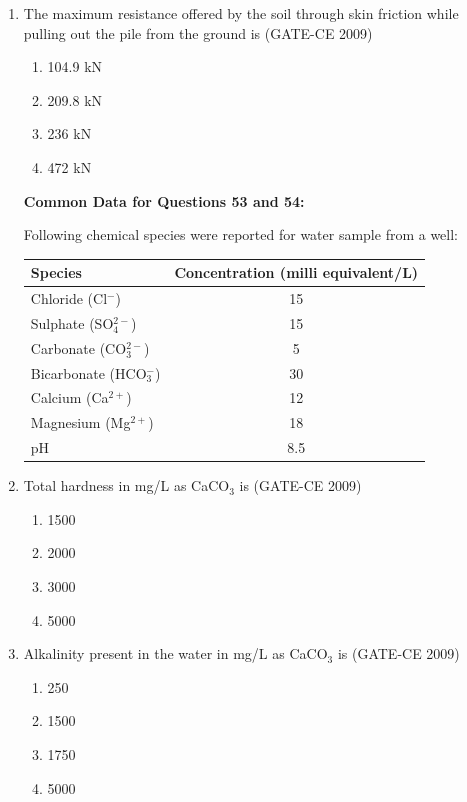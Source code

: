 \documentclass[journal,12pt,onecolumn]{article}
\theoremstyle{remark}
\begin{document}
\begin{enumerate}
    \item The maximum resistance offered by the soil through skin friction while pulling out the pile from the ground is (GATE-CE 2009)
    \begin{multicols}{4}
    \begin{enumerate}
        \item 104.9 kN 
        \item 209.8 kN 
        \item 236 kN 
        \item 472 kN
    \end{enumerate}
\end{multicols}

\textbf{Common Data for Questions 53 and 54:}

Following chemical species were reported for water sample from a well:
\begin{center}
\begin{tabular}{|l|c|}
\hline
\textbf{Species} & \textbf{Concentration (milli equivalent/L)} \\
\hline
Chloride (Cl$^-$) & 15 \\
Sulphate (SO$_4^{2-}$) & 15 \\
Carbonate (CO$_3^{2-}$) & 5 \\
Bicarbonate (HCO$_3^-$) & 30 \\
Calcium (Ca$^{2+}$) & 12 \\
Magnesium (Mg$^{2+}$) & 18 \\
pH & 8.5 \\
\hline
\end{tabular}
\end{center}

    \item Total hardness in mg/L as CaCO$_3$ is (GATE-CE 2009)
    \begin{multicols}{2}
    \begin{enumerate}
        \item 1500 
        \item 2000 
        \item 3000 
        \item 5000
    \end{enumerate}
\end{multicols}
    
    \item Alkalinity present in the water in mg/L as CaCO$_3$ is (GATE-CE 2009)
    \begin{multicols}{4}
    \begin{enumerate}
        \item 250 
        \item 1500 
        \item 1750 
        \item 5000
    \end{enumerate}
\end{multicols}


\end{enumerate}
\end{document}
